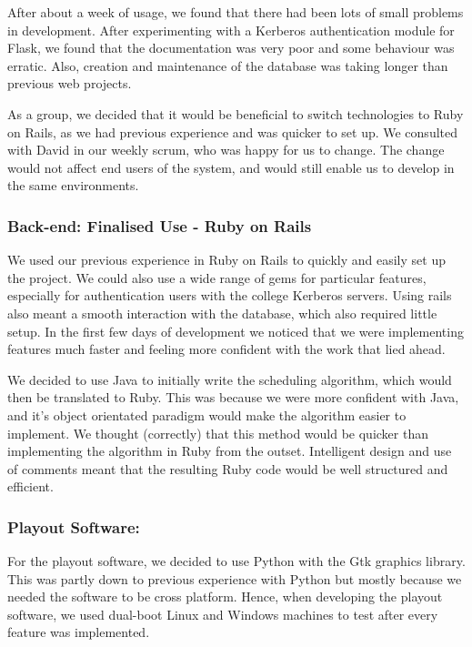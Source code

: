 \documentclass[a4paper, titlepage]{article}
\begin{document}
After about a week of usage, we found that there had been lots of small problems in development. After 
experimenting with a Kerberos authentication module for Flask, we found that the documentation was 
very poor and some behaviour was erratic. Also, creation and maintenance of the database was taking 
longer than previous web projects. 

As a group, we decided that it would be beneficial to switch technologies to Ruby on Rails, as we had
previous experience and was quicker to set up. We consulted with David in our weekly scrum, who was
happy for us to change. The change would not affect end users of the system, and would still enable us 
to develop in the same environments. 

\subsubsection{Back-end: Finalised Use - Ruby on Rails} \label{sec:impl_RoR}

We used our previous experience in Ruby on Rails to quickly and easily set up the project. We could also
use a wide range of gems for particular features, especially for authentication users with the college
Kerberos servers. Using rails also meant a smooth interaction with the database, which also required 
little setup. In the first few days of development we noticed that we were implementing features much
faster and feeling more confident with the work that lied ahead. 

We decided to use Java to initially write the scheduling algorithm, which would then be translated to 
Ruby. This was because we were more confident with Java, and it's object orientated paradigm would make 
the algorithm easier to implement. We thought (correctly) that this method would be quicker than
implementing the algorithm in Ruby from the outset. Intelligent design and use of comments meant that
the resulting Ruby code would be well structured and efficient.
  

\subsubsection{Playout Software: }
For the playout software, we decided to use Python with the Gtk graphics library. This was partly down
to previous experience with Python but mostly because we needed the software to be cross platform. Hence,
when developing the playout software, we used dual-boot Linux and Windows machines to test after every 
feature was implemented. 
\end{document}
